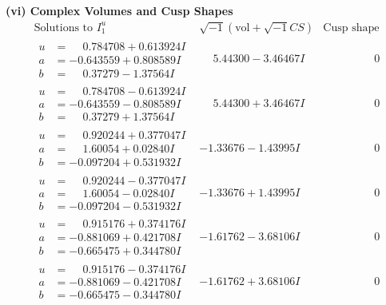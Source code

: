 \documentclass[1p]{elsarticle_modified}
\theoremstyle{definition}
\newcommand{\I}{\sqrt{-1}}
\begin{document}
\newpage\flushleft \textbf{(vi) Complex Volumes and Cusp Shapes}
$$\begin{array}{c|c|c}  
\text{Solutions to }I^u_{1}& \I (\text{vol} + \sqrt{-1}CS) & \text{Cusp shape}\\
 \hline 
\begin{aligned}
u &= \phantom{-}0.784708 + 0.613924 I \\
a &= -0.643559 + 0.808589 I \\
b &= \phantom{-}0.37279 - 1.37564 I\end{aligned}
 & \phantom{-}5.44300 - 3.46467 I & \phantom{-0.000000 } 0 \\ \hline\begin{aligned}
u &= \phantom{-}0.784708 - 0.613924 I \\
a &= -0.643559 - 0.808589 I \\
b &= \phantom{-}0.37279 + 1.37564 I\end{aligned}
 & \phantom{-}5.44300 + 3.46467 I & \phantom{-0.000000 } 0 \\ \hline\begin{aligned}
u &= \phantom{-}0.920244 + 0.377047 I \\
a &= \phantom{-}1.60054 + 0.02840 I \\
b &= -0.097204 + 0.531932 I\end{aligned}
 & -1.33676 - 1.43995 I & \phantom{-0.000000 } 0 \\ \hline\begin{aligned}
u &= \phantom{-}0.920244 - 0.377047 I \\
a &= \phantom{-}1.60054 - 0.02840 I \\
b &= -0.097204 - 0.531932 I\end{aligned}
 & -1.33676 + 1.43995 I & \phantom{-0.000000 } 0 \\ \hline\begin{aligned}
u &= \phantom{-}0.915176 + 0.374176 I \\
a &= -0.881069 + 0.421708 I \\
b &= -0.665475 + 0.344780 I\end{aligned}
 & -1.61762 - 3.68106 I & \phantom{-0.000000 } 0 \\ \hline\begin{aligned}
u &= \phantom{-}0.915176 - 0.374176 I \\
a &= -0.881069 - 0.421708 I \\
b &= -0.665475 - 0.344780 I\end{aligned}
 & -1.61762 + 3.68106 I & \phantom{-0.000000 } 0 \\ \hline\begin{aligned}

\end{aligned}
\end{array}$$
\end{document}
